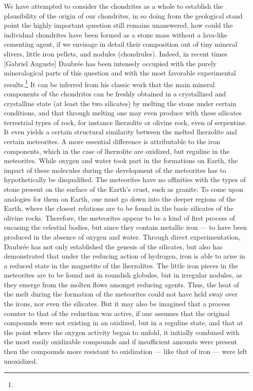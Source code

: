 \documentclass[a4paper, 12pt, oneside]{article}
\begin{document}
We have attempted to consider the chondrites as a whole to establish the plausibility of the origin of our chondrites, in so doing from the geological stand point the highly important question still remains unanswered, how could the individual chondrites have been formed as a stone mass without a lava-like cementing agent, if we envisage in detail their composition out of tiny mineral slivers, little iron pellets, and nodules (chondrules). Indeed, in recent times [Gabriel Auguste] Daubrée has been intensely occupied with the purely mineralogical parts of this question and with the most favorable experimental results.\footnote{} It can be inferred from his classic work that the main mineral components of the chondrites can be freshly obtained in a crystallized and crystalline state (at least the two silicates) by melting the stone under certain conditions, and that through melting one may even produce with these silicates terrestrial types of rock, for instance lherzolite or olivine rock, even of serpentine. It even yields a certain structural similarity between the melted lherzolite and certain meteorites. A more essential difference is attributable to the iron components, which in the case of lherzolite are oxidized, but reguline in the meteorites. While oxygen and water took part in the formations on Earth, the impact of these molecules during the development of the meteorites has to hypothetically be disqualified. The meteorites have no affinities with the types of stone present on the surface of the Earth's crust, such as granite. To come upon analogies for them on Earth, one must go down into the deeper regions of the Earth, where the closest relations are to be found in the basic silicates of the olivine rocks. Therefore, the meteorites appear to be a kind of first process of encasing the celestial bodies, but since they contain metallic iron --- to have been produced in the absence of oxygen and water. Through direct experimentation, Daubrée has not only established the genesis of the silicates, but also has demonstrated that under the reducing action of hydrogen, iron is able to arise in a reduced state in the magnetite of the lherzolites. The little iron pieces in the meteorites are to be found not in roundish globules, but in irregular nodules, as they emerge from the molten flows amongst reducing agents. Thus, the heat of the melt during the formation of the meteorites could not have held sway over the irons, nor even the silicates. But it may also be imagined that a process counter to that of the reduction was active, if one assumes that the original compounds were not existing in an oxidized, but in a reguline state, and that at the point where the oxygen activity began to unfold, it initially combined with the most easily oxidizable compounds and if insufficient amounts were present then the compounds more resistant to oxidization --- like that of iron --- were left unoxidized.
\end{document}
